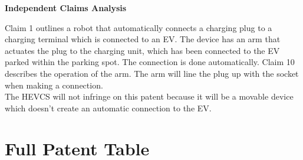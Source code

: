 \documentclass [12pt]{article}
\begin{document}
\textbf{Independent Claims Analysis}

Claim 1 outlines a robot that automatically connects a charging plug to a charging terminal which is connected to an EV. The device has an arm that actuates the plug to the charging unit, which has been connected to the EV parked within the parking spot. The connection is done automatically.
Claim 10 describes the operation of the arm. The arm will line the plug up with the socket when making a connection.
\\
The HEVCS will not infringe on this patent because it will be a movable device which doesn’t create an automatic connection to the EV.


 \newpage
 
 

\newpage
\appendix
\section{Full Patent Table}\label{app:full_patent_table}
\end{document}
